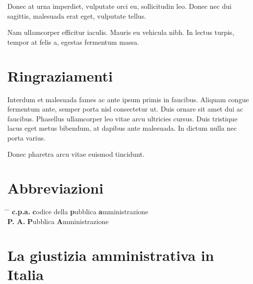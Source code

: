 \documentclass[12pt,it,a4paper,]{report}
\begin{document}
Donec at urna imperdiet, vulputate orci eu, sollicitudin leo. Donec nec
dui sagittis, malesuada erat eget, vulputate tellus.

Nam ullamcorper efficitur iaculis. Mauris eu vehicula nibh. In lectus
turpis, tempor at felis a, egestas fermentum massa.

\setcounter{page}{1}

\hypertarget{ringraziamenti}{%
\chapter*{Ringraziamenti}\label{ringraziamenti}}

Interdum et malesuada fames ac ante ipsum primis in faucibus. Aliquam
congue fermentum ante, semper porta nisl consectetur ut. Duis ornare sit
amet dui ac faucibus. Phasellus ullamcorper leo vitae arcu ultricies
cursus. Duis tristique lacus eget metus bibendum, at dapibus ante
malesuada. In dictum nulla nec porta varius.

Donec pharetra arcu vitae euismod tincidunt.

\newpage


\tableofcontents

\newpage

\hypertarget{abbreviazioni}{%
\chapter*{Abbreviazioni}\label{abbreviazioni}}

\begin{tabbing}
\hspace{12em} \= \hspace{60em} \= \kill
\textbf{c.p.a.} \> \textbf{c}odice della \textbf{p}ubblica \textbf{a}mministrazione \\
\textbf{P. A.} \> \textbf{P}ubblica \textbf{A}mministrazione \\
\end{tabbing}

\newpage

\setcounter{page}{1}
\doublespacing
\setlength{\parindent}{0.5in}

\hypertarget{la-giustizia-amministrativa-in-italia}{%
\chapter{La giustizia amministrativa in
Italia}\label{la-giustizia-amministrativa-in-italia}}
\end{document}
